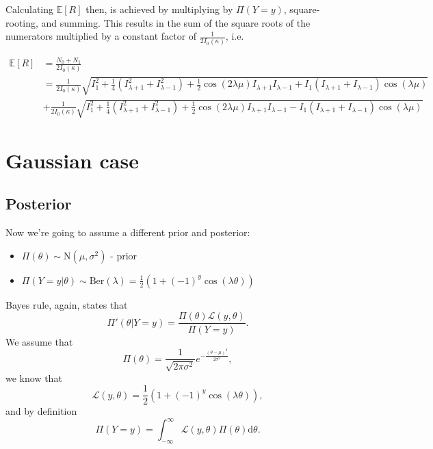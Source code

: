 \documentclass[]{report}
\begin{document}
Calculating $\mathbb{E}[R]$ then, is achieved by multiplying by  $\Pi(Y = y)$, square-rooting, and summing. This results in the sum of the square roots of the numerators multiplied by a constant factor of $\frac{1}{2 I_0(\kappa)}$, i.e.

\begin{align*}
	\mathbb{E}[R] &= \frac{N_0 + N_1}{2 I_0(\kappa)} \\
		      &= \frac{1}{2 I_0(\kappa) } \sqrt{I_1^2 + \frac{1}{4} \left( I_{\lambda + 1}^{2} + I_{\lambda - 1}^2 \right)  + \frac{1}{2}\cos(2 \lambda \mu) I_{\lambda +1} I_{\lambda - 1} + I_1 \left( I_{\lambda + 1} + I_{\lambda -1 } \right) \cos (\lambda \mu) } \\
		      & + \frac{1}{2 I_0(\kappa) } \sqrt{I_1^2 + \frac{1}{4} \left( I_{\lambda + 1}^{2} + I_{\lambda - 1}^2 \right)  + \frac{1}{2}\cos(2 \lambda \mu) I_{\lambda +1} I_{\lambda - 1} - I_1 \left( I_{\lambda + 1} + I_{\lambda -1 } \right) \cos (\lambda \mu) }
\end{align*}

\section{Gaussian case}
\subsection{Posterior}
Now we're going to assume a different prior and posterior:

\begin{itemize}
	\item $\Pi(\theta) \sim \text{N}(\mu, \sigma^2)$ - prior
	\item $\Pi(Y=y | \theta) \sim \text{Ber}(\lambda) = \frac{1}{2}(1 + (-1)^{y} \cos(\lambda \theta))$
\end{itemize}
Bayes rule, again, states that
\begin{equation}
    \Pi'(\theta|Y = y) = \frac{\Pi(\theta) \mathcal{L} (y, \theta)}{\Pi(Y=y)}.
\end{equation}
We assume that
\begin{equation}
    \Pi(\theta) = \frac{1}{\sqrt{2\pi \sigma^2}} e^{-\frac{(\theta - \mu)^2}{2\sigma^2}},
\end{equation}
we know that
\begin{equation}
    \mathcal{L} (y, \theta) = \frac{1}{2}(1 + (-1)^{y} \cos(\lambda \theta)),
\end{equation}
and by definition
\begin{equation}
\label{eq:normalisation-factor}
    \Pi(Y=y) = \int_{-\infty}^{\infty} \mathcal{L}(y, \theta) \Pi(\theta) \text{d}\theta.
\end{equation}
\end{document}
